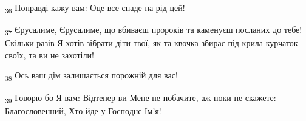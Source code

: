 \begin{tcolorbox}
\textsubscript{36} Поправді кажу вам: Оце все спаде на рід цей!
\end{tcolorbox}
\begin{tcolorbox}
\textsubscript{37} Єрусалиме, Єрусалиме, що вбиваєш пророків та каменуєш посланих до тебе! Скільки разів Я хотів зібрати діти твої, як та квочка збирає під крила курчаток своїх, та ви не захотіли!
\end{tcolorbox}
\begin{tcolorbox}
\textsubscript{38} Ось ваш дім залишається порожній для вас!
\end{tcolorbox}
\begin{tcolorbox}
\textsubscript{39} Говорю бо Я вам: Відтепер ви Мене не побачите, аж поки не скажете: Благословенний, Хто йде у Господнє Ім'я!
\end{tcolorbox}
